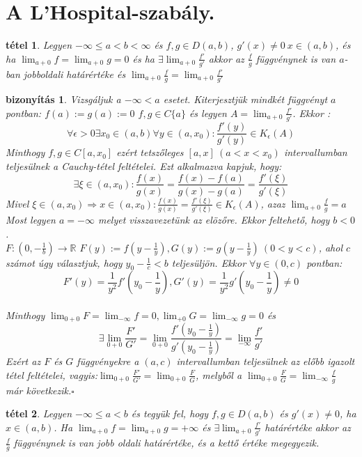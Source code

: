 \documentclass{article}
\newcommand{\ob}{\hfill$\square$}
\newcommand{\R}{\mathbb{R}}
\newcommand{\nn}{\Rightarrow}
\newcommand{\di}{\displaystyle}
\theoremstyle{magyar}
\newtheorem{te}{tétel}[section]
\newtheorem{bi}{bizonyítás}[section]
\begin{document}
  \section{A L'Hospital-szabály.}
  \begin{te}
    Legyen $-\infty\le a<b<\infty$ és $f,g\in D(a,b)$, $g'(x)\not=0\ x\in(a,b)$, 
    és ha $\di\lim_{a+0}f=\lim_{a+0}g=0$ és ha $\di\exists\lim_{a+0}\frac{f'}
    {g'}$ akkor az $\di\frac{f}{g}$ függvénynek is van $a$-ban jobboldali 
    határértéke és $\di\lim_{a+0}\frac{f}{g}=\lim_{a+0}\frac{f'}{g'}$
\end{te}
  \begin{bi}
    Vizsgáljuk a $-\infty<a$ esetet. Kiterjesztjük mindkét függvényt $a$ pontban: $f(a):=g(a):=0$ $f,g\in C\{a\}$ és legyen 
    $A=\di\lim_{a+0}\frac{f'}{g'}$. Ekkor :
    \[\forall\epsilon>0 \exists x_0\in(a,b) \forall y\in(a,x_0) : 
    \frac{f'(y)}{g'(y)}\in K_\epsilon(A) \]
    Minthogy $f,g\in C[a,x_0]$ ezért tetszőleges $[a,x]\ (a<x<x_0)$ 
    intervallumban teljesülnek a Cauchy-tétel feltételei. Ezt alkalmazva kapjuk, 
    hogy:
    \[\exists \xi\in(a,x_0): \frac{f(x)}{g(x)}=\frac{f(x)-f(a)}{g(x)-g(a)}=
    \frac{f'(\xi)}{g'(\xi)} \]
    Mivel $\di\xi\in(a,x_0)\nn x\in(a,x_0):\frac{f(x)}{g(x)}=\frac{f'(\xi)}
    {g'(\xi)}\in K_\epsilon(A)$, azaz $\di\lim_{a+0}\frac{f}{g}=a$ \\
    Most legyen $a=-\infty$ melyet visszavezetünk az elözőre. Ekkor feltehető, hogy
    $b<0$. \\ 
    $F: (0,-\frac{1}{b})\rightarrow\R$  $F(y):=f(y-
    \frac1{y}),G(y):=g(y-\frac1{y})\ (0<y<c)$, ahol $c$ számot úgy választjuk, 
    hogy $y_0-\frac1{c}<b$ teljesüljön. Ekkor $\forall y\in(0,c)$ pontban:
    \[F'(y)=\frac1{y^2}f'(y_0-\frac1{y}), G'(y)=\frac1{y^2}g'(y_0-\frac1{y})\not=0\] \\
    Minthogy $\di\lim_{0+0}F=\lim_{-\infty}f=0,\lim_{+0}G=\lim_{-\infty}g=0$ és 
    \[\exists\lim_{0+0}\frac{F'}{G'}=\lim_{0+0}\frac{f'(y_0-\frac1{y})}{g'(y_0-\frac1{y})}=
    \lim_{-\infty}\frac{f'}{g'}\]
    Ezért az $F$ és $G$ függvényekre a $(a,c)$  intervallumban teljesülnek az
    előbb 
    igazolt tétel feltételei, vagyis:$\di\lim_{0+0}\frac{F'}{G'}=\lim_{0+0}\frac{F}
    {G}$, melyből a $\di\lim_{0+0}\frac{F}{G}=\lim_{-\infty}\frac{f}{g}$ már 
    következik.\ob
  \end{bi}
  \begin{te}
    Legyen $-\infty\le a<b$ és tegyük fel, hogy $f,g\in D(a,b)$ és $g'(x)\not=0$,
    ha $x\in(a,b)$. Ha $\di\lim_{a+0}f=\lim_{a+0}g=+\infty$ és $\di\exists
    \lim_{a+0}\frac{f'}{g'}$ határértéke akkor az $\di\frac{f}{g}$ függvénynek 
    is van jobb oldali határértéke, és a kettő értéke megegyezik.
  \end{te}
\end{document}

